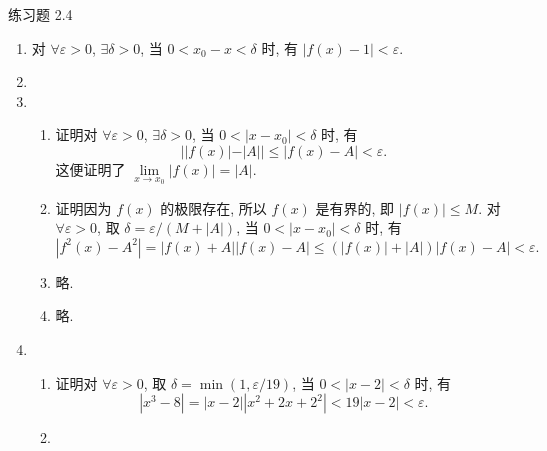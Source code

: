 



% 


\begin{center}
    {\heiti 练习题 2.4}
\end{center}

\begin{enumerate}
    \item %
        对 $\forall \varepsilon > 0$, $\exists \delta > 0$, 当 $0 < x_0 - x < \delta$ 时, 有 $|f(x) - 1| < \varepsilon$.
    \item %
    \item %
        \begin{enumerate}[(1)]
            \item %
                {\heiti 证明}\quad 对 $\forall \varepsilon > 0$, $\exists \delta > 0$, 当 $0 < |x - x_0| < \delta$ 时, 有
                \[
                    ||f(x)| - |A|| \leqslant |f(x) - A| < \varepsilon.    
                \]
                这便证明了 $\lim\limits_{x\to x_0}|f(x)| = |A|$.
            \item %
                {\heiti 证明}\quad 因为 $f(x)$ 的极限存在, 所以 $f(x)$ 是有界的, 即 $|f(x)| \leqslant M$.
                对 $\forall \varepsilon > 0$, 取 $\delta = \varepsilon/(M + |A|)$, 当 $0 < |x - x_0| < \delta$ 时, 有
                \[
                    |f^2(x) - A^2| = |f(x) + A||f(x) - A| \leqslant (|f(x)| + |A|)|f(x) - A| < \varepsilon.
                \]
            \item %
                略.
            \item %
                略.
        \end{enumerate}
    \item %
        \begin{enumerate}[(1)]
            \item %
                {\heiti 证明}\quad 对 $\forall \varepsilon > 0$, 取 $\delta = \min(1, \varepsilon/19)$, 当 $0 < |x - 2| < \delta$ 时, 有
                \[
                    |x^3 - 8| = |x - 2||x^2 + 2x + 2^2| < 19|x - 2| < \varepsilon.   
                \]
            \item %

\end{enumerate}
\end{enumerate}

